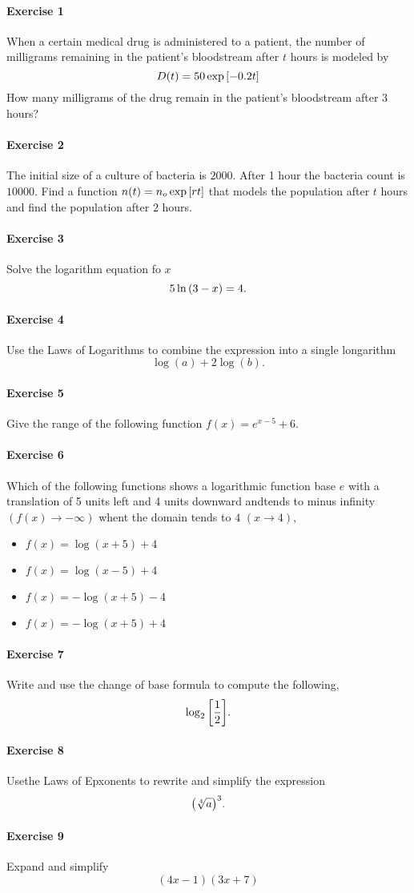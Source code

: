 \documentclass[main.tex]{subfiles}
\begin{document}
\paragraph{Exercise 1}
When a certain medical drug is administered to a patient, the number of milligrams remaining in the patient's bloodstream after $t$ hours is modeled by \[D(t)=50\exp\qty[-0.2t]\] How many milligrams of the drug remain in the patient's bloodstream after $3$ hours?

\paragraph{Exercise 2}
The initial size of a culture of bacteria is $2000$.
After 1 hour the bacteria count is $10000$.
Find a function $n(t)=n_o\exp\qty[rt]$ that models the population after $t$ hours and find the population after $2$ hours.

\paragraph{Exercise 3}
Solve the logarithm equation fo $x$ \[5\ln\qty(3-x)=4.\]

\paragraph{Exercise 4}
Use the Laws of Logarithms to combine the expression into a single longarithm \[\log(a)+2\log(b).\]

\paragraph{Exercise 5}
Give the range of the following function $f(x)=e^{x-5}+6$.

\paragraph{Exercise 6}
Which of the following functions shows a logarithmic function base $e$ with a translation of 5 units left and 4 units downward andtends to minus infinity $(f(x)\to-\infty)$ whent the domain tends to $4$ $(x\to4)$,
\begin{itemize}
    \item $f(x)=\log(x+5)+4$ 
    \item $f(x)=\log(x-5)+4$
    \item $f(x)=-\log(x+5)-4$ 
    \item $f(x)=-\log(x+5)+4$ 
\end{itemize}

\paragraph{Exercise 7}
Write and use the change of base formula to compute the following,\[\log_2\qty[\frac{1}{2}].\]

\paragraph{Exercise 8}
Usethe Laws of Epxonents to rewrite and simplify the expression
\[\qty(\sqrt[4]{a})^{3}.\]

\paragraph{Exercise 9}
Expand and simplify
\[(4x-1)(3x+7)\]
\end{document}
